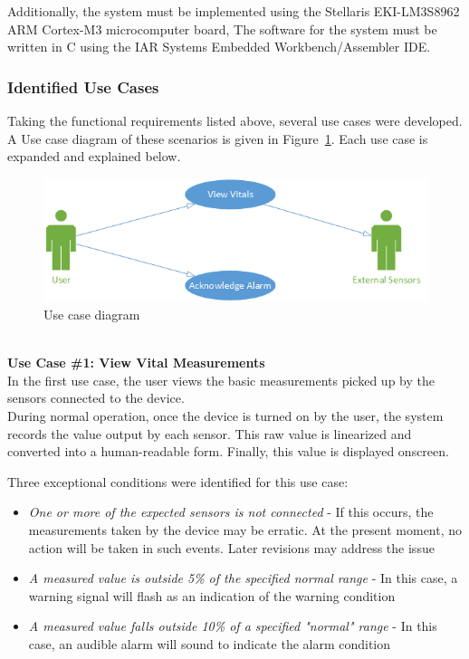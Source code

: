 \documentclass[12pt]{article} %
\begin{document}
Additionally, the system must be implemented using the Stellaris 
EKI-LM3S8962 ARM Cortex-M3 microcomputer board, The software for the system 
must be written in C using the IAR Systems Embedded Workbench/Assembler IDE.



\subsubsection{Identified Use Cases}
Taking the functional requirements listed above, several use cases were
 developed. A Use case diagram of these scenarios is given in Figure~\ref{fig:useCases}. Each use case is expanded and explained below.

\begin{figure}[h]
	\centering
	\includegraphics[width=\textwidth]{../design/use_cases_graphical.png}
	\caption{Use case diagram}
	\label{fig:useCases}
\end{figure}

~\\
\textbf{Use Case \#1: View Vital Measurements } \\
In the first use case, the user views the basic measurements picked up by the
sensors connected to the device. \\
During normal operation, once the device is turned on by the user, the system
records the value output by each sensor. This raw value is linearized and 
converted into a human-readable form. Finally, this value is displayed onscreen.

Three exceptional conditions were identified for this use case: 
\begin{itemize}
  \item \emph{One or more of the expected sensors is not connected} - If this occurs, the measurements taken by the device may be erratic. At the present moment, no action will be taken in such events. Later revisions may address the issue
\item \emph{A measured value is outside 5\% of the specified normal range} - In this case, a warning signal will flash as an indication of the warning condition
\item \emph{A measured value falls outside 10\% of a specified "normal" range} - In this case, an audible alarm will sound to indicate the alarm condition
\end{itemize}
\end{document}
